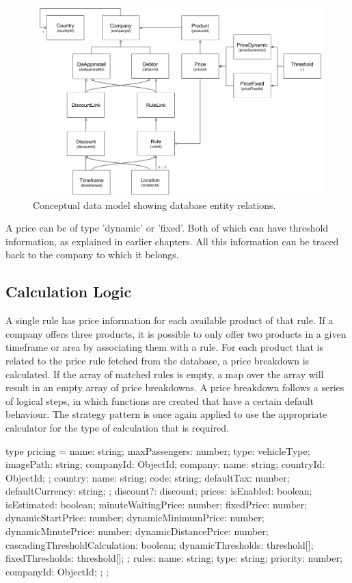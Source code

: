 \begin{figure}[H]
	\centering
	\includegraphics[width=1\textwidth]{DataModel}
	\caption[DataModel]{Conceptual data model showing database entity relations.}
	\label{fig:DataModel}
\end{figure}

A price can be of type 'dynamic' or 'fixed'. Both of which can have threshold information, as explained in earlier chapters. All this information can be traced back to the company to which it belongs.


\subsection{Calculation Logic}
A single rule has price information for each available product of that rule. If a company offers three products, it is possible to only offer two products in a given timeframe or area by associating them with a rule. For each product that is related to the price rule fetched from the database, a price breakdown is calculated. If the array of matched rules is empty, a map over the array will result in an empty array of price breakdowns. A price breakdown follows a series of logical steps, in which functions are created that have a certain default behaviour. The strategy pattern is once again applied to use the appropriate calculator for the type of calculation that is required.

type pricing = {
  name: string;
  maxPassengers: number;
  type: vehicleType;
  imagePath: string;
  companyId: ObjectId;
  company: {
    name: string;
    countryId: ObjectId;
  };
  country: {
    name: string;
    code: string;
    defaultTax: number;
    defaultCurrency: string;
  };
  discount?: discount;
  prices: {
    isEnabled: boolean;
    isEstimated: boolean;
    minuteWaitingPrice: number;
    fixedPrice: number;
    dynamicStartPrice: number;
    dynamicMinimumPrice: number;
    dynamicMinutePrice: number;
    dynamicDistancePrice: number;
    cascadingThresholdCalculation: boolean;
    dynamicThresholds: threshold[];
    fixedThresholds: threshold[];
  };
  rules: {
    name: string;
    type: string;
    priority: number;
    companyId: ObjectId;
  };
};


